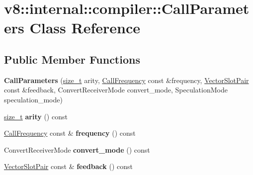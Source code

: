 \hypertarget{classv8_1_1internal_1_1compiler_1_1CallParameters}{}\section{v8\+:\+:internal\+:\+:compiler\+:\+:Call\+Parameters Class Reference}
\label{classv8_1_1internal_1_1compiler_1_1CallParameters}
\subsection*{Public Member Functions}
\begin{DoxyCompactItemize}
\item 
\mbox{\label{classv8_1_1internal_1_1compiler_1_1CallParameters_af73c28d32d4bf1c54e08b38608a44ad0}} 
{\bfseries Call\+Parameters} (\mbox{\hyperlink{classsize__t}{size\+\_\+t}} arity, \mbox{\hyperlink{classv8_1_1internal_1_1compiler_1_1CallFrequency}{Call\+Frequency}} const \&frequency, \mbox{\hyperlink{classv8_1_1internal_1_1VectorSlotPair}{Vector\+Slot\+Pair}} const \&feedback, Convert\+Receiver\+Mode convert\+\_\+mode, Speculation\+Mode speculation\+\_\+mode)
\item 
\mbox{\label{classv8_1_1internal_1_1compiler_1_1CallParameters_af9b0b387a050ce1b8729f65882c44dec}} 
\mbox{\hyperlink{classsize__t}{size\+\_\+t}} {\bfseries arity} () const
\item 
\mbox{\label{classv8_1_1internal_1_1compiler_1_1CallParameters_a72de05f1d9a644cc4fa931a048b61b00}} 
\mbox{\hyperlink{classv8_1_1internal_1_1compiler_1_1CallFrequency}{Call\+Frequency}} const  \& {\bfseries frequency} () const
\item 
\mbox{\label{classv8_1_1internal_1_1compiler_1_1CallParameters_a2fc76538a9ebece453fe9fd0770abf27}} 
Convert\+Receiver\+Mode {\bfseries convert\+\_\+mode} () const
\item 
\mbox{\label{classv8_1_1internal_1_1compiler_1_1CallParameters_a95ab99a11dc641b69a078f58ecd644db}} 
\mbox{\hyperlink{classv8_1_1internal_1_1VectorSlotPair}{Vector\+Slot\+Pair}} const  \& {\bfseries feedback} () const

\end{DoxyCompactItemize}
